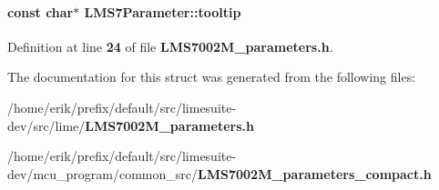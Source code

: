 \paragraph[{tooltip}]{\setlength{\rightskip}{0pt plus 5cm}const char$\ast$ L\+M\+S7\+Parameter\+::tooltip}\label{structLMS7Parameter_a91d58ac69443282e848e7d76748627c6}


Definition at line {\bf 24} of file {\bf L\+M\+S7002\+M\+\_\+parameters.\+h}.



The documentation for this struct was generated from the following files\+:\begin{DoxyCompactItemize}
\item 
/home/erik/prefix/default/src/limesuite-\/dev/src/lime/{\bf L\+M\+S7002\+M\+\_\+parameters.\+h}\item 
/home/erik/prefix/default/src/limesuite-\/dev/mcu\+\_\+program/common\+\_\+src/{\bf L\+M\+S7002\+M\+\_\+parameters\+\_\+compact.\+h}\end{DoxyCompactItemize}
